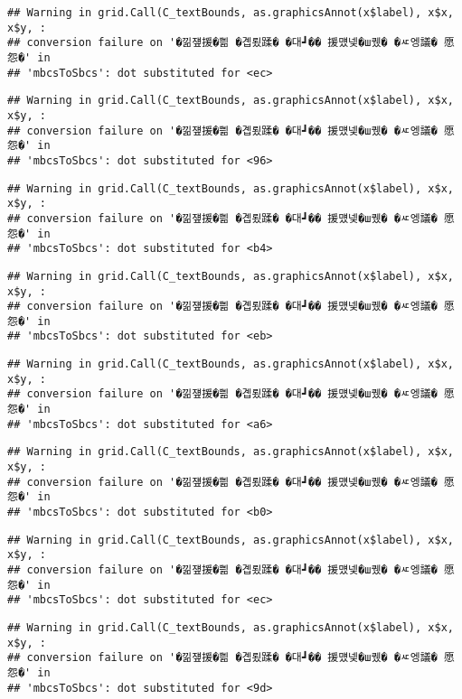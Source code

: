 \documentclass[
]{article}
\begin{document}
\begin{verbatim}
## Warning in grid.Call(C_textBounds, as.graphicsAnnot(x$label), x$x, x$y, :
## conversion failure on '�낆쟾援�쁾 �곕룄蹂� �대┛�� 援먰넻�ш퀬� �ㅼ엥議� 愿怨�' in
## 'mbcsToSbcs': dot substituted for <ec>
\end{verbatim}

\begin{verbatim}
## Warning in grid.Call(C_textBounds, as.graphicsAnnot(x$label), x$x, x$y, :
## conversion failure on '�낆쟾援�쁾 �곕룄蹂� �대┛�� 援먰넻�ш퀬� �ㅼ엥議� 愿怨�' in
## 'mbcsToSbcs': dot substituted for <96>
\end{verbatim}

\begin{verbatim}
## Warning in grid.Call(C_textBounds, as.graphicsAnnot(x$label), x$x, x$y, :
## conversion failure on '�낆쟾援�쁾 �곕룄蹂� �대┛�� 援먰넻�ш퀬� �ㅼ엥議� 愿怨�' in
## 'mbcsToSbcs': dot substituted for <b4>
\end{verbatim}

\begin{verbatim}
## Warning in grid.Call(C_textBounds, as.graphicsAnnot(x$label), x$x, x$y, :
## conversion failure on '�낆쟾援�쁾 �곕룄蹂� �대┛�� 援먰넻�ш퀬� �ㅼ엥議� 愿怨�' in
## 'mbcsToSbcs': dot substituted for <eb>
\end{verbatim}

\begin{verbatim}
## Warning in grid.Call(C_textBounds, as.graphicsAnnot(x$label), x$x, x$y, :
## conversion failure on '�낆쟾援�쁾 �곕룄蹂� �대┛�� 援먰넻�ш퀬� �ㅼ엥議� 愿怨�' in
## 'mbcsToSbcs': dot substituted for <a6>
\end{verbatim}

\begin{verbatim}
## Warning in grid.Call(C_textBounds, as.graphicsAnnot(x$label), x$x, x$y, :
## conversion failure on '�낆쟾援�쁾 �곕룄蹂� �대┛�� 援먰넻�ш퀬� �ㅼ엥議� 愿怨�' in
## 'mbcsToSbcs': dot substituted for <b0>
\end{verbatim}

\begin{verbatim}
## Warning in grid.Call(C_textBounds, as.graphicsAnnot(x$label), x$x, x$y, :
## conversion failure on '�낆쟾援�쁾 �곕룄蹂� �대┛�� 援먰넻�ш퀬� �ㅼ엥議� 愿怨�' in
## 'mbcsToSbcs': dot substituted for <ec>
\end{verbatim}

\begin{verbatim}
## Warning in grid.Call(C_textBounds, as.graphicsAnnot(x$label), x$x, x$y, :
## conversion failure on '�낆쟾援�쁾 �곕룄蹂� �대┛�� 援먰넻�ш퀬� �ㅼ엥議� 愿怨�' in
## 'mbcsToSbcs': dot substituted for <9d>
\end{verbatim}
\end{document}
